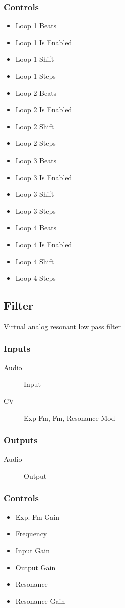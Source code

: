 \subsubsection{Controls}
\begin{itemize}
\item Loop 1 Beats
\item Loop 1 Is Enabled
\item Loop 1 Shift
\item Loop 1 Steps
\item Loop 2 Beats
\item Loop 2 Is Enabled
\item Loop 2 Shift
\item Loop 2 Steps
\item Loop 3 Beats
\item Loop 3 Is Enabled
\item Loop 3 Shift
\item Loop 3 Steps
\item Loop 4 Beats
\item Loop 4 Is Enabled
\item Loop 4 Shift
\item Loop 4 Steps
\end{itemize}

\subsection{Filter}

Virtual analog resonant low pass filter



\subsubsection{Inputs}
\begin{description}
\item [Audio] Input
\item [CV] Exp Fm, Fm, Resonance Mod
\end{description}

\subsubsection{Outputs}
\begin{description}
\item [Audio] Output
\end{description}

\subsubsection{Controls}
\begin{itemize}
\item Exp. Fm Gain
\item Frequency
\item Input Gain
\item Output Gain
\item Resonance
\item Resonance Gain
\end{itemize}

